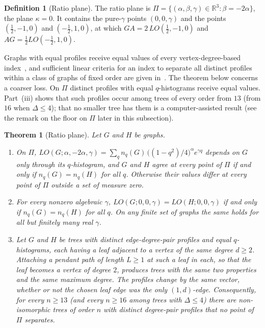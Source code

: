 \documentclass[a5paper, 10pt]{article}
\theoremstyle{plain}
\newtheorem{theorem}{Theorem}
\theoremstyle{remark}
\theoremstyle{definition}
\newtheorem{definition}{Definition}
\begin{document}
  \begin{definition}[Ratio plane]\label{def:ratioplane}
  The ratio plane is
  $\Pi = \{(\alpha,\beta,\gamma) \in \mathbb{R}^3 : \beta = -2\alpha\}$,
  the plane $\kappa = 0$. It contains the pure-$\gamma$ points
  $(0,0,\gamma)$ and the points $(\tfrac12,-1,0)$ and $(-\tfrac12,1,0)$,
  at which $GA = 2\,LO(\tfrac12,-1,0)$ and $AG = \tfrac12 LO(-\tfrac12,1,0)$.
  \end{definition}

  Graphs with equal profiles receive equal values of every
  vertex-degree-based index~\cite{Rada2019ExpVDB, Rada2026LinearVDB}, and
  sufficient linear criteria for an index to separate all distinct
  profiles within a class of graphs of fixed order are given
  in~\cite{RadaRodriguezSigarreta2022Weak, Rada2026LinearVDB}. The theorem below concerns a
  coarser loss. On $\Pi$ distinct profiles with equal $q$-histograms
  receive equal values. Part~(iii) shows that such profiles occur among
  trees of every order from $13$ (from $16$ when $\Delta \le 4$); that
  no smaller tree has them is a computer-assisted result (see the
  remark on the floor on $\Pi$ later in this subsection).

  \begin{theorem}[Ratio plane]\label{thm:ratioplane}
  Let $G$ and $H$ be graphs.
  \begin{enumerate}
  \item[(i)] On $\Pi$,
  $LO(G;\alpha,-2\alpha,\gamma) = \sum_q n_q(G)\,\bigl((1-q^2)/4\bigr)^{\alpha}
  e^{\gamma q}$ depends on $G$ only through its $q$-histogram, and $G$ and
  $H$ agree at every point of $\Pi$ if and only if $n_q(G) = n_q(H)$
  for all $q$. Otherwise their values differ at every point of $\Pi$
  outside a set of measure zero.
  \item[(ii)] For every nonzero algebraic $\gamma$,
  $LO(G;0,0,\gamma) = LO(H;0,0,\gamma)$ if and only if
  $n_q(G) = n_q(H)$ for all $q$. On any finite set of graphs the same
  holds for all but finitely many real $\gamma$.
  \item[(iii)] Let $G$ and $H$ be trees with distinct
  edge-degree-pair profiles and equal $q$-histograms, each having a
  leaf adjacent to a vertex of the same degree $d \ge 2$. Attaching a pendant path of length $L \ge 1$ at such a leaf in each,
  so that the leaf becomes a vertex of degree $2$, produces trees with the same two properties and the same maximum
  degree. The profiles change by the same vector, whether or not the
  chosen leaf edge was the only $(1,d)$-edge.
  Consequently, for every $n \ge 13$ (and every $n \ge 16$ among trees
  with $\Delta \le 4$) there are non-isomorphic trees of order $n$
  with distinct degree-pair profiles that no point of $\Pi$ separates.
  \end{enumerate}
  \end{theorem}
\end{document}
